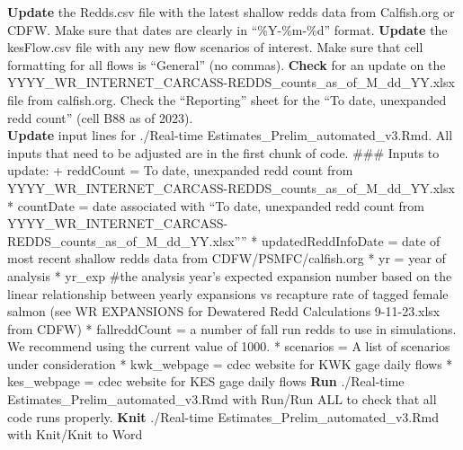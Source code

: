 \documentclass[
]{article}
\begin{document}
\textbf{Update} the Redds.csv file with the latest shallow redds data
from Calfish.org or CDFW. Make sure that dates are clearly in
``\%Y-\%m-\%d'' format. \textbf{Update} the kesFlow.csv file with any
new flow scenarios of interest. Make sure that cell formatting for all
flows is ``General'' (no commas). \textbf{Check} for an update on the
YYYY\_WR\_INTERNET\_CARCASS-REDDS\_counts\_as\_of\_M\_dd\_YY.xlsx file
from calfish.org. Check the ``Reporting'' sheet for the ``To date,
unexpanded redd count'' (cell B88 as of 2023).\\
\textbf{Update} input lines for ./Real-time
Estimates\_Prelim\_automated\_v3.Rmd. All inputs that need to be
adjusted are in the first chunk of code. \#\#\# Inputs to update: +
reddCount = To date, unexpanded redd count from
YYYY\_WR\_INTERNET\_CARCASS-REDDS\_counts\_as\_of\_M\_dd\_YY.xlsx *
countDate = date associated with ``To date, unexpanded redd count from
YYYY\_WR\_INTERNET\_CARCASS-REDDS\_counts\_as\_of\_M\_dd\_YY.xlsx'''' *
updatedReddInfoDate = date of most recent shallow redds data from
CDFW/PSMFC/calfish.org * yr = year of analysis * yr\_exp \#the analysis
year's expected expansion number based on the linear relationship
between yearly expansions vs recapture rate of tagged female salmon (see
WR EXPANSIONS for Dewatered Redd Calculations 9-11-23.xlsx from CDFW) *
fallreddCount = a number of fall run redds to use in simulations. We
recommend using the current value of 1000. * scenarios = A list of
scenarios under consideration * kwk\_webpage = cdec website for KWK gage
daily flows * kes\_webpage = cdec website for KES gage daily flows
\textbf{Run} ./Real-time Estimates\_Prelim\_automated\_v3.Rmd with
Run/Run ALL to check that all code runs properly. \textbf{Knit}
./Real-time Estimates\_Prelim\_automated\_v3.Rmd with Knit/Knit to Word
\end{document}
